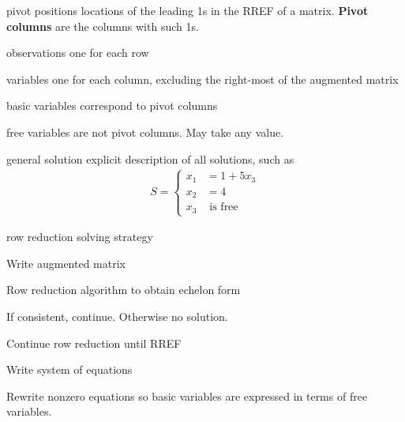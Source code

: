 \begin{card}
\begin{compactdesc}
    \item[pivot positions] locations of the leading 1s in the RREF of a matrix.
        \textbf{Pivot columns} are the columns with such 1s.
    \item[observations] one for each row
    \item[variables] one for each column, excluding the right-most of
        the augmented matrix
    \item[basic variables] correspond to pivot columns
    \item[free variables] are not pivot columns. May take any value.
    \item[general solution] explicit description of all solutions, such
        as
        \begin{align*}
        S = \begin{cases}
        x_1 &= 1 + 5x_3 \\
        x_2 &= 4 \\
        x_3 &\text{ is free}
        \end{cases}
        \end{align*}
    \item[row reduction solving strategy]
        \begin{compactenum}
        \item Write augmented matrix
        \item Row reduction algorithm to obtain echelon form
        \item If consistent, continue. Otherwise no solution.
        \item Continue row reduction until RREF
        \item Write system of equations
        \item Rewrite nonzero equations so basic variables are expressed in
            terms of free variables.
        \end{compactenum}
    \end{compactdesc}
\end{card}
